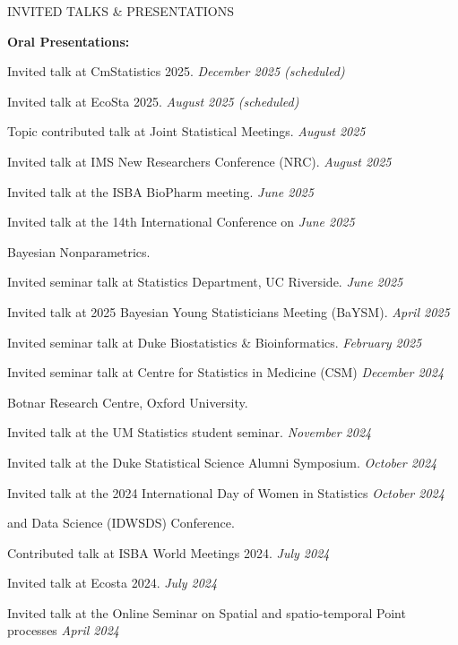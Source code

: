 \documentclass{resume} %
\newcommand{\thisYear}[1]{
	#1
}
\begin{document}
\begin{rSection}{INVITED TALKS \& PRESENTATIONS}
	
	\hspace{-.2in} {\textbf{Oral Presentations:}}
	
	Invited talk at CmStatistics 2025.  \hfill {\em December 2025 (scheduled)}
	
	Invited talk at EcoSta 2025. \hfill {\em August 2025 (scheduled)}
	
	Topic contributed talk at Joint Statistical Meetings. \hfill {\em August 2025}
	
	Invited talk at IMS New Researchers Conference (NRC). \hfill {\em August 2025}
	
	Invited talk at the ISBA BioPharm meeting.  \hfill {\em June 2025}
	
	Invited talk at the 14th International Conference on   \hfill {\em June 2025}
	
	\vspace*{-0.1in}
	Bayesian Nonparametrics. 
	
	Invited seminar talk at Statistics Department, UC Riverside.  \hfill {\em June 2025}
	
	Invited talk at 2025 Bayesian Young Statisticians Meeting (BaYSM). \hfill {\em April 2025}
	

	Invited seminar talk at Duke Biostatistics \& Bioinformatics.  \hfill {\em February 2025}

	

	Invited seminar talk at Centre for Statistics in Medicine (CSM)  \hfill {\em December 2024}


	\vspace{-0.1in} 
	Botnar Research Centre, Oxford University. 


	Invited talk at the UM Statistics student seminar.  \hfill {\em November 2024} 

	
	\thisYear{
	Invited talk at the Duke Statistical Science Alumni Symposium.  \hfill {\em October 2024} 
}
	
	Invited talk at the 2024 International Day of Women  in Statistics 
	 \hfill {\em October 2024} 
	
	\vspace{-0.1in} 
	and Data Science (IDWSDS) Conference. 
	
	\thisYear{
	Contributed talk at ISBA World Meetings 2024.  \hfill {\em July 2024}
}
	
	\thisYear{
	Invited talk at Ecosta 2024.  \hfill {\em July 2024}
}
	
	Invited talk at the Online Seminar on Spatial and spatio-temporal Point processes   \hfill {\em April 2024}
	

\end{rSection}
\end{document}
